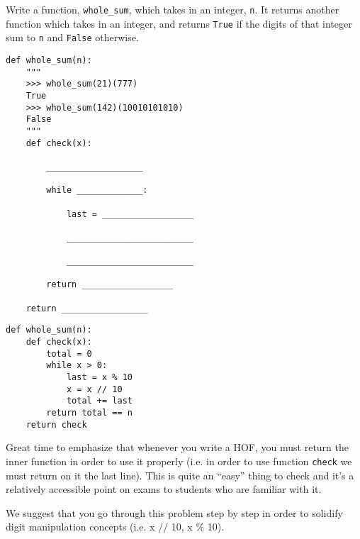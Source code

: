 \begin{blocksection}
\question Write a function, \texttt{whole\_sum}, which takes in an integer, \texttt{n}. It returns another function which takes in an integer, and returns \texttt{True} if the digits of that integer sum to \texttt{n} and \texttt{False} otherwise.

\begin{lstlisting}
def whole_sum(n): 
    """ 
    >>> whole_sum(21)(777)
    True
    >>> whole_sum(142)(10010101010)
    False
    """
    def check(x):

        ___________________
		
        while _____________:
		
            last = __________________
				
            _________________________
				
            _________________________
				
        return __________________
		
    return _________________

\end{lstlisting}

\begin{solution}
\begin{lstlisting}
def whole_sum(n):
    def check(x):
        total = 0
        while x > 0:
            last = x % 10
            x = x // 10
            total += last
        return total == n
    return check
\end{lstlisting}
\end{solution}
\end{blocksection}

\begin{questionmeta}

    Great time to emphasize that whenever you write a HOF,
    you must return the inner function in order to use it properly
    (i.e. in order to use function \lstinline{check} we must return on it the last line). 
    This is quite an ``easy'' thing to check and it's a relatively accessible point on
    exams to students who are familiar with it. 

    We suggest that you go through this problem step by step
    in order to solidify digit manipulation concepts (i.e. x // 10, x \% 10).
\end{questionmeta}
